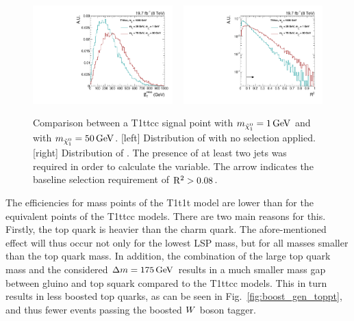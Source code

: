 \begin{figure}[htbp]
 \centering
\includegraphics[width=0.48\textwidth]{figures/razor_interpretation/Eff_drop_met}
~
\includegraphics[width=0.48\textwidth]{figures/razor_interpretation/Eff_drop_rsq}
\caption{Comparison between a T1ttcc signal point with $m_{\tilde{\chi}_1^0} = 1\,\text{Ge\hspace{-.08em}V}$ and with $m_{\tilde{\chi}_1^0} =
50\,\text{Ge\hspace{-.08em}V}$. [left] Distribution of \ETm with no selection applied.
[right] Distribution of \rsq. The presence of at least two jets was required in order to calculate
the \rsq variable. The arrow indicates the baseline selection requirement of $\mathrm{R^2} > 0.08$.
 \label{fig:boost_eff_drop_met_rsq}}
\end{figure}

The efficiencies for mass points of the T1t1t model are lower than for the equivalent points of the
T1ttcc models. There are two main reasons for this.
Firstly, the top quark is heavier than the charm quark. The afore-mentioned effect will thus occur
not only for the lowest LSP mass, but for all masses smaller than the top quark mass. 
In addition, the combination of the large top quark mass and the considered $\Delta m = 175\,\text{Ge\hspace{-.08em}V}$
results in a much smaller mass gap between gluino and top squark compared to the T1ttcc models.
This in turn results in less boosted top quarks, as can be seen in Fig.~\ref{fig:boost_gen_toppt},
and thus fewer events passing the boosted $W$ boson tagger. 

